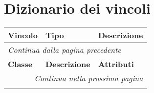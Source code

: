 \section{Dizionario dei vincoli}
\begin{longtable}{|p{}|p{}|p{}|}
	\hline
	\textbf{Vincolo} & \textbf{Tipo} & \textbf{Descrizione} \\
	\hline
	\endfirsthead
	
	\multicolumn{3}{l}{\footnotesize\itshape Continua dalla pagina precedente} \\
	\hline
	\textbf{Classe} & \textbf{Descrizione} & \textbf{Attributi} \\
	\hline
	\endhead
	
	\hline
	\multicolumn{3}{r}{\footnotesize\itshape Continua nella prossima pagina} \\
	\endfoot
	
	\hline
	\endlastfoot

	
	
\end{longtable}